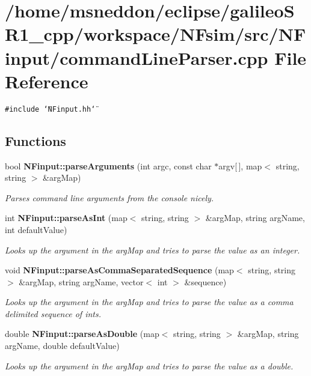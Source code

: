 \section{/home/msneddon/eclipse/galileoSR1\_\-cpp/workspace/NFsim/src/NFinput/commandLineParser.cpp File Reference}
\label{commandLineParser_8cpp}


{\tt \#include \char`\"{}NFinput.hh\char`\"{}}\par
\subsection*{Functions}
\begin{CompactItemize}
\item 
bool {\bf NFinput::parseArguments} (int argc, const char $\ast$argv[$\,$], map$<$ string, string $>$ \&argMap)
\begin{CompactList}\small\item\em Parses command line arguments from the console nicely. \item\end{CompactList}\item 
int {\bf NFinput::parseAsInt} (map$<$ string, string $>$ \&argMap, string argName, int defaultValue)
\begin{CompactList}\small\item\em Looks up the argument in the argMap and tries to parse the value as an integer. \item\end{CompactList}\item 
void {\bf NFinput::parseAsCommaSeparatedSequence} (map$<$ string, string $>$ \&argMap, string argName, vector$<$ int $>$ \&sequence)
\begin{CompactList}\small\item\em Looks up the argument in the argMap and tries to parse the value as a comma delimited sequence of ints. \item\end{CompactList}\item 
double {\bf NFinput::parseAsDouble} (map$<$ string, string $>$ \&argMap, string argName, double defaultValue)
\begin{CompactList}\small\item\em Looks up the argument in the argMap and tries to parse the value as a double. \item\end{CompactList}\item 

\end{CompactItemize}
